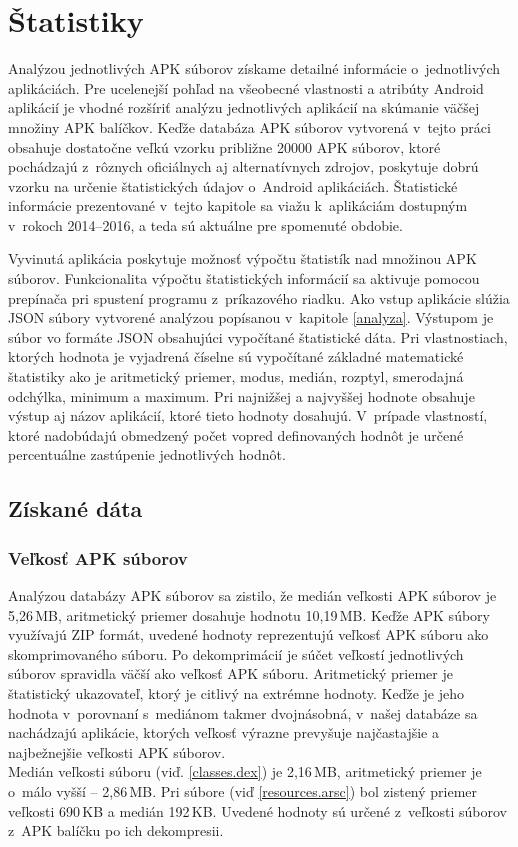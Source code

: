\chapter{Štatistiky}
\label{statistiky}
Analýzou jednotlivých APK súborov získame detailné informácie o~jednotlivých aplikáciách. Pre ucelenejší pohľad na všeobecné vlastnosti a atribúty Android aplikácií je vhodné rozšíriť analýzu jednotlivých aplikácií na skúmanie väčšej množiny APK balíčkov. Keďže databáza APK súborov vytvorená v~tejto práci obsahuje dostatočne veľkú vzorku približne 20000 APK súborov, ktoré pochádzajú z~rôznych oficiálnych aj alternatívnych zdrojov, poskytuje dobrú vzorku na určenie štatistických údajov o~Android aplikáciách. Štatistické informácie prezentované v~tejto kapitole sa viažu k~aplikáciám dostupným v~rokoch 2014--2016, a teda sú aktuálne pre spomenuté obdobie.

Vyvinutá aplikácia  poskytuje možnosť výpočtu štatistík nad množinou APK súborov. Funkcionalita výpočtu štatistických informácií sa aktivuje pomocou prepínača  pri spustení programu z~príkazového riadku. Ako vstup aplikácie slúžia JSON súbory vytvorené analýzou popísanou v~kapitole \ref{analyza}. Výstupom je súbor vo formáte JSON obsahujúci vypočítané štatistické dáta. Pri vlastnostiach, ktorých hodnota je vyjadrená číselne sú vypočítané základné matematické štatistiky ako je aritmetický priemer, modus, medián, rozptyl, smerodajná odchýlka, minimum a maximum. Pri najnižšej a najvyššej hodnote obsahuje výstup aj názov aplikácií, ktoré tieto hodnoty dosahujú. V~prípade vlastností, ktoré nadobúdajú obmedzený počet vopred definovaných hodnôt je určené percentuálne zastúpenie jednotlivých hodnôt.

\section{Získané dáta}
\subsection{Veľkosť APK súborov}
Analýzou databázy APK súborov sa zistilo, že medián veľkosti APK súborov je 5,26\,MB, aritmetický priemer dosahuje hodnotu 10,19\,MB. Keďže APK súbory využívajú ZIP formát, uvedené hodnoty reprezentujú veľkosť APK súboru ako skomprimovaného súboru. Po dekomprimácií je súčet veľkostí jednotlivých súborov spravidla väčší ako veľkosť APK súboru. Aritmetický priemer je štatistický ukazovateľ, ktorý je citlivý na extrémne hodnoty. Keďže je jeho hodnota v~porovnaní s~mediánom takmer dvojnásobná, v~našej databáze sa nachádzajú aplikácie, ktorých veľkosť výrazne prevyšuje najčastajšie a najbežnejšie veľkosti APK súborov.\\ Medián veľkosti súboru  (viď. \ref{classes.dex}) je 2,16\,MB, aritmetický priemer je o~málo vyšší -- 2,86\,MB. Pri súbore  (viď \ref{resources.arsc}) bol zistený priemer veľkosti 690\,KB a medián 192\,KB. Uvedené hodnoty sú určené z~veľkosti súborov z~APK balíčku po ich dekompresii.

